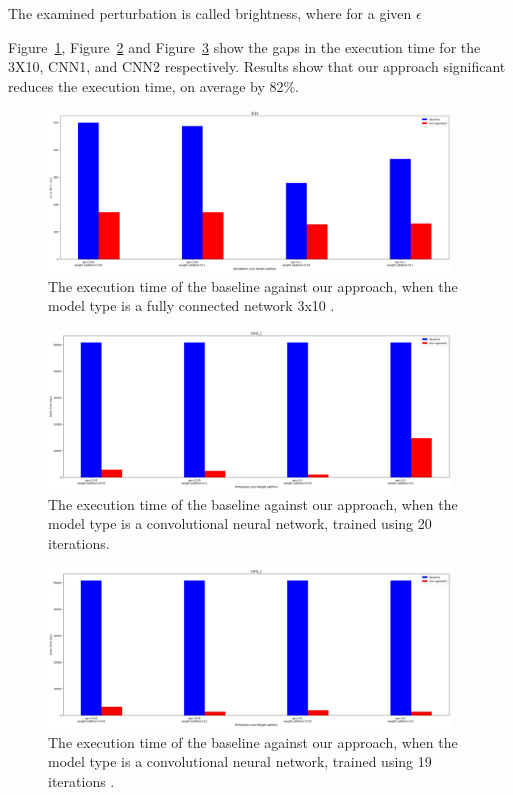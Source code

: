 The examined perturbation is called brightness, where for a given $\epsilon$  %

Figure~\ref{fig:3_x_10}, Figure~\ref{fig:cnn0_1} and Figure~\ref{fig:cnn0_2} show the gaps in the execution time for the 3X10, CNN1, and CNN2 respectively.
Results show that our approach significant reduces the execution time, on average by 82\%. 
\begin{figure}[ht]
  \centering
  \includegraphics[width=0.95\textwidth]{3x10.png}
  \caption{The execution time of the baseline against our approach, when the model type is a fully connected network 3x10 .}
  \label{fig:3_x_10}
\end{figure}

\begin{figure}[ht]
  \centering
  \includegraphics[width=0.95\textwidth]{cnn0_1.png}
  \caption{The execution time of the baseline against our approach, when the model type is a convolutional neural network, trained using 20 iterations.}
  \label{fig:cnn0_1}
\end{figure}

\begin{figure}[ht]
  \centering
  \includegraphics[width=0.95\textwidth]{cnn0_2.png}
  \caption{The execution time of the baseline against our approach, when the model type is a convolutional neural network, trained using 19 iterations .}
  \label{fig:cnn0_2}
\end{figure}

